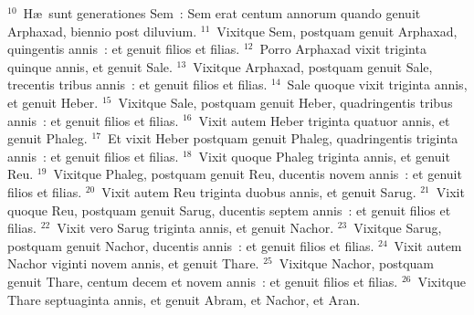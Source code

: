 ${}^{10}$~H\ae\ sunt generationes Sem~: Sem erat centum annorum quando genuit Arphaxad, biennio post diluvium.
${}^{11}$~Vixitque Sem, postquam genuit Arphaxad, quingentis annis~: et genuit filios et filias.
${}^{12}$~Porro Arphaxad vixit triginta quinque annis, et genuit Sale.
${}^{13}$~Vixitque Arphaxad, postquam genuit Sale, trecentis tribus annis~: et genuit filios et filias.
${}^{14}$~Sale quoque vixit triginta annis, et genuit Heber.
${}^{15}$~Vixitque Sale, postquam genuit Heber, quadringentis tribus annis~: et genuit filios et filias.
${}^{16}$~Vixit autem Heber triginta quatuor annis, et genuit Phaleg.
${}^{17}$~Et vixit Heber postquam genuit Phaleg, quadringentis triginta annis~: et genuit filios et filias.
${}^{18}$~Vixit quoque Phaleg triginta annis, et genuit Reu.
${}^{19}$~Vixitque Phaleg, postquam genuit Reu, ducentis novem annis~: et genuit filios et filias.
${}^{20}$~Vixit autem Reu triginta duobus annis, et genuit Sarug.
${}^{21}$~Vixit quoque Reu, postquam genuit Sarug, ducentis septem annis~: et genuit filios et filias.
${}^{22}$~Vixit vero Sarug triginta annis, et genuit Nachor.
${}^{23}$~Vixitque Sarug, postquam genuit Nachor, ducentis annis~: et genuit filios et filias.
${}^{24}$~Vixit autem Nachor viginti novem annis, et genuit Thare.
${}^{25}$~Vixitque Nachor, postquam genuit Thare, centum decem et novem annis~: et genuit filios et filias.
${}^{26}$~Vixitque Thare septuaginta annis, et genuit Abram, et Nachor, et Aran.


